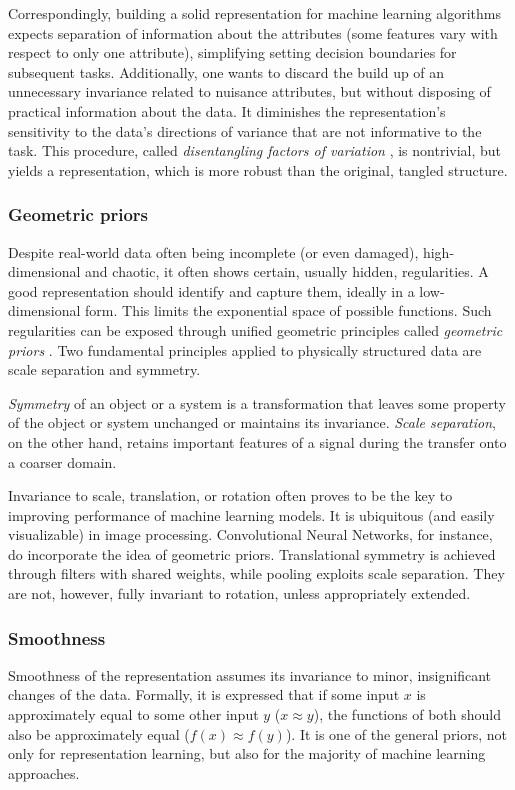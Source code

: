 \vspace{\baselineskip}
Correspondingly, building a solid representation for machine learning algorithms expects separation of information about the attributes (some features vary with respect to only one attribute), simplifying setting decision boundaries for subsequent tasks. Additionally, one wants to discard the build up of an unnecessary invariance related to nuisance attributes, but without disposing of practical information about the data. It diminishes the representation's sensitivity to the data's directions of variance that are not informative to the task. This procedure, called \textit{disentangling factors of variation} \cite{Szabo2017}, is nontrivial, but yields a representation, which is more robust than the original, tangled structure. 


\subsubsection{Geometric priors}
Despite real-world data often being incomplete (or even damaged), high-dimensional and chaotic, it often shows certain, usually hidden, regularities. A good representation should identify and capture them, ideally in a low-dimensional form. This limits the exponential space of possible functions. Such regularities can be exposed through unified geometric principles called \textit{geometric priors} \cite{Bronstein2021}. Two fundamental principles applied to physically structured data are scale separation and symmetry.

\vspace{\baselineskip}
\textit{Symmetry} of an object or a system is a transformation that leaves some property of the object or system unchanged or maintains its invariance. \textit{Scale separation}, on the other hand, retains important features of a signal during the transfer onto a coarser domain. 

\vspace{\baselineskip}
Invariance to scale, translation, or rotation often proves to be the key to improving performance of machine learning models. It is ubiquitous (and easily visualizable) in image processing. Convolutional Neural Networks, for instance, do incorporate the idea of geometric priors. Translational symmetry is achieved through filters with shared weights, while pooling exploits scale separation. They are not, however, fully invariant to rotation, unless appropriately extended.

\subsubsection{Smoothness}
Smoothness of the representation assumes its invariance to minor, insignificant changes of the data. Formally, it is expressed that if some input $x$ is approximately equal to some other input $y$ ($x \approx y$), the functions of both should also be approximately equal ($f(x) \approx f(y)$). It is one of the general priors, not only for representation learning, but also for the majority of machine learning approaches.

